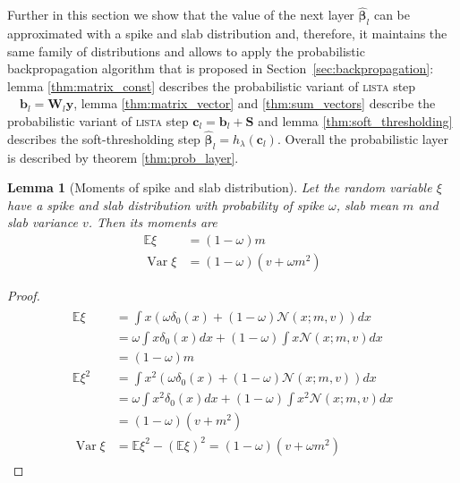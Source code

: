 \documentclass[letterpaper]{article}
\newtheorem{lemma}{Lemma}
\begin{document}
Further in this section we show that the value of the next layer $\widehat{\boldsymbol\beta}_l$ can be approximated with a spike and slab distribution and, therefore, it maintains the same family of distributions and allows to apply the probabilistic backpropagation algorithm that is proposed in Section~\ref{sec:backpropagation}: lemma \ref{thm:matrix_const} describes the probabilistic variant of \textsc{lista} step $\quad \mathbf{b}_l = \mathbf{W}_l \mathbf{y}$, lemma \ref{thm:matrix_vector} and \ref{thm:sum_vectors} describe the probabilistic variant of \textsc{lista} step $ \mathbf{c}_l = \mathbf{b}_l +\mathbf{S}$ and lemma \ref{thm:soft_thresholding} describes the soft-thresholding step $\widehat{\boldsymbol\beta}_{l} = h_\lambda(\mathbf{c}_l)$. Overall the probabilistic layer is described by theorem \ref{thm:prob_layer}.

\begin{lemma}[Moments of spike and slab distribution]
\label{thm:moments_spsl}
Let the random variable $\xi$ have a spike and slab distribution with probability of spike $\omega$, slab mean $m$ and slab variance $v$. Then its moments are
\begin{subequations}
\begin{align}
\mathbb{E}\xi &= (1-\omega)m \\
\operatorname{Var}\xi & = (1-\omega)(v + \omega m^2)
\end{align}
\end{subequations}
\end{lemma}

\begin{proof}
\begin{align*}
\begin{split}
\mathbb{E}\xi &= \int x (\omega \delta_0(x) + (1 - \omega)\mathcal{N}(x; m, v))dx \\
& = \omega \int x \delta_0(x)dx + (1 - \omega)\int x \mathcal{N}(x; m, v)dx \\
& = (1-\omega)m \\
\mathbb{E}\xi^2 &= \int x^2 (\omega \delta_0(x) + (1 - \omega)\mathcal{N}(x; m, v))dx \\
& = \omega \int x^2 \delta_0(x)dx + (1 - \omega)\int x^2 \mathcal{N}(x; m, v)dx \\
& = (1-\omega)(v + m^2) \\
\operatorname{Var}\xi &= \mathbb{E}\xi^2 - \left(\mathbb{E}\xi\right)^2 = (1-\omega)(v + \omega m^2)
\end{split}
\end{align*}
\end{proof}
\end{document}
